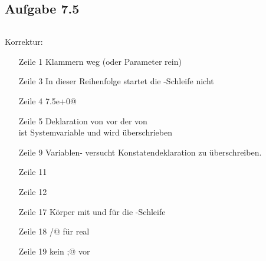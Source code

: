 \documentclass[a4paper, 12pt]{article}
\begin{document}
\subsection*{Aufgabe 7.5}
\inputminted[linenos]{pascal}{aufg5.pas}
Korrektur:
\begin{itemize}
  \item[Zeile 1]  Klammern weg (oder Parameter rein)
  \item[Zeile 3]  In dieser Reihenfolge startet die
                    \texttt@for@-Schleife nicht
  \item[Zeile 4]  \texttt@7.5e+0@
  \item[Zeile 5]  Deklaration von \texttt@pi@ vor der von
                    \texttt@minuspi@\\
                    \texttt@pi@ ist Systemvariable und wird
                    überschrieben
  \item[Zeile 9]  Variablen- versucht Konstatendeklaration zu überschreiben.
  \item[Zeile 11] \texttt@boolean@
  \item[Zeile 12] \texttt@factor@
  \item[Zeile 17] Körper mit \texttt@begin@ und
                    \texttt@end@ für die
                    \texttt@while@-Schleife
  \item[Zeile 18] \texttt@/@ für real
  \item[Zeile 19] kein \texttt@;@ vor \texttt@else@
\end{itemize}
\end{document}
